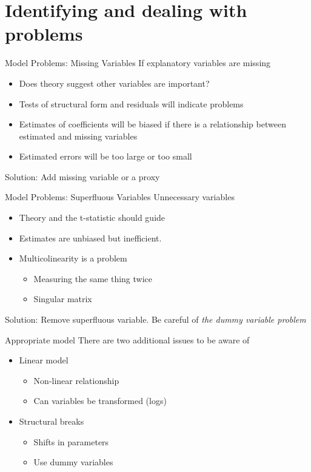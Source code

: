 \documentclass[14pt,xcolor=pdftex,dvipsnames,table]{beamer}\usepackage[]{graphicx}\usepackage[]{color}
\begin{document}
\section{Identifying and dealing with problems}
\begin{frame}{Model Problems: Missing Variables}
If explanatory variables are missing
\pause
\begin{itemize}[<+-| alert@+>]
\item Does theory suggest other variables are important?
\item Tests of structural form and residuals will indicate problems
\item Estimates of coefficients will be biased if there is a relationship between estimated and missing variables
\item Estimated errors will be too large or too small
\end{itemize}
\pause
\begin{block}{}
Solution:
Add missing variable or a proxy
\end{block}
\end{frame}

\begin{frame}{Model Problems: Superfluous Variables}
Unnecessary variables
\pause
\begin{itemize}[<+-| alert@+>]
\item Theory and the t-statistic should guide
\item Estimates are unbiased but inefficient.
\item Multicolinearity is a problem
\begin{itemize}
\item Measuring the same thing twice
\item Singular matrix
\end{itemize}
\end{itemize}
\pause
\begin{block}{}
Solution:
Remove superfluous variable.  Be careful of \emph{the dummy variable problem}
\end{block}
\end{frame}

\begin{frame}{Appropriate model}
There are two additional issues to be aware of 
\pause
\begin{itemize}[<+-| alert@+>]
\item Linear model
\begin{itemize}
\item Non-linear relationship
\item Can variables be transformed (logs)
\end{itemize}
\item Structural breaks
\begin{itemize}
\item Shifts in parameters
\item Use dummy variables
\end{itemize}
\end{itemize}
\end{frame}
\end{document}

